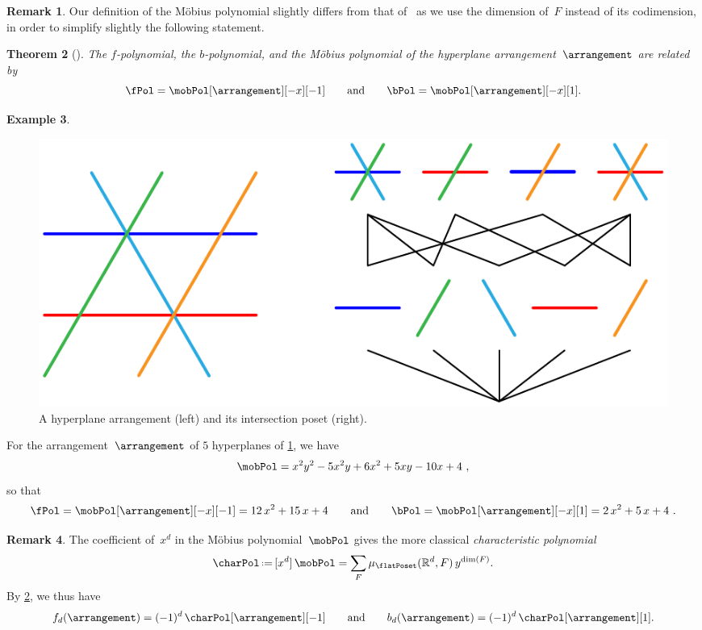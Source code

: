 \documentclass{amsart}
\newcommand{\darkblue}{\color{darkblue}} %
\newtheorem{theorem}{Theorem}[section]
\theoremstyle{definition}
\newtheorem{example}[theorem]{Example}
\newtheorem{remark}[theorem]{Remark}
\newcommand{\R}{\mathbb{R}} %
\newcommand{\eqdef}{\mbox{\,\raisebox{0.2ex}{\scriptsize\ensuremath{\mathrm:}}\ensuremath{=}\,}} %
\newcommand{\defn}[1]{\textsl{\darkblue #1}} %
\begin{document}
\begin{remark}
Our definition of the M\"obius polynomial slightly differs from that of~\cite{Zaslavsky} as we use the dimension of~$F$ instead of its codimension, in order to simplify slightly the following statement.
\end{remark}

\begin{theorem}[{\cite[Thm.~A]{Zaslavsky}}]
\label{thm:Zaslavsky}
The $f$-polynomial, the $b$-polynomial, and the M\"obius polynomial of the hyperplane arrangement~$\arrangement$ are related by
\[
\fPol = \mobPol[\arrangement][-x][-1]
\qquad\text{and}\qquad
\bPol = \mobPol[\arrangement][-x][1].
\]
\end{theorem}

\begin{example}
%
\begin{figure}
	\centerline{\includegraphics[scale=.9]{intersectionPoset}}
	\caption{A hyperplane arrangement (left) and its intersection poset (right).}
	\label{fig:arrangement}
\end{figure}
%
For the arrangement~$\arrangement$ of $5$ hyperplanes of \cref{fig:arrangement}, we have
\[
\mobPol = x^2y^2 - 5x^2y + 6x^2 + 5xy - 10x + 4 \ ,
\]
so that
\[
\fPol = \mobPol[\arrangement][-x][-1] = 12 \, x^2 + 15 \, x + 4 
\qquad \text{and}\qquad
\bPol = \mobPol[\arrangement][-x][1] = 2 \, x^2 + 5 \, x + 4 \ .
\]
\end{example}

\begin{remark}
\label{rem:characteristicPolynomial}
The coefficient of~$x^d$ in the M\"obius polynomial~$\mobPol$ gives the more classical \defn{characteristic polynomial}
\[
\charPol \eqdef [x^d] \, \mobPol = \sum_F \mu_{\flatPoset}(\R^d,F) \, y^{\dim(F)} .
\]
By \cref{thm:Zaslavsky}, we thus have
\[
f_d(\arrangement) = (-1)^d \, \charPol[\arrangement][-1] 
\qquad\text{and}\qquad
b_d(\arrangement) = (-1)^d \, \charPol[\arrangement][1].
\]
\end{remark}
\end{document}
